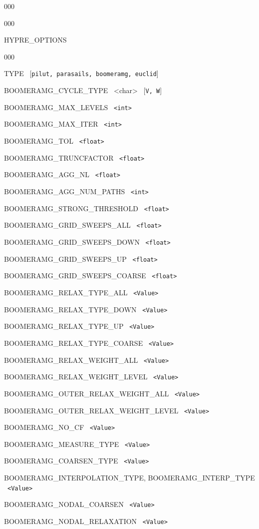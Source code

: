 \begin{deflist}{000}
\begin{deflist}{000}
\item[HYPRE\_OPTIONS]
\begin{deflist}{000}
\item[TYPE] \ [{\tt pilut, parasails, boomeramg, euclid}]
\item[BOOMERAMG\_CYCLE\_TYPE] \ <char> \ [{\tt V, W}]
\item[BOOMERAMG\_MAX\_LEVELS] \ {\tt <int>}
\item[BOOMERAMG\_MAX\_ITER] \ {\tt <int>}
\item[BOOMERAMG\_TOL] \ {\tt <float>}
\item[BOOMERAMG\_TRUNCFACTOR] \ {\tt <float>}
\item[BOOMERAMG\_AGG\_NL] \ {\tt <float>}
\item[BOOMERAMG\_AGG\_NUM\_PATHS] \ {\tt <int>}
\item[BOOMERAMG\_STRONG\_THRESHOLD] \ {\tt <float>}
\item[BOOMERAMG\_GRID\_SWEEPS\_ALL] \ {\tt <float>}
\item[BOOMERAMG\_GRID\_SWEEPS\_DOWN] \ {\tt <float>}
\item[BOOMERAMG\_GRID\_SWEEPS\_UP] \ {\tt <float>}
\item[BOOMERAMG\_GRID\_SWEEPS\_COARSE] \ {\tt <float>}
\item[BOOMERAMG\_RELAX\_TYPE\_ALL] \ {\tt <Value>}
\item[BOOMERAMG\_RELAX\_TYPE\_DOWN] \ {\tt <Value>}
\item[BOOMERAMG\_RELAX\_TYPE\_UP] \ {\tt <Value>}
\item[BOOMERAMG\_RELAX\_TYPE\_COARSE] \ {\tt <Value>}
\item[BOOMERAMG\_RELAX\_WEIGHT\_ALL] \ {\tt <Value>}
\item[BOOMERAMG\_RELAX\_WEIGHT\_LEVEL] \ {\tt <Value>}
\item[BOOMERAMG\_OUTER\_RELAX\_WEIGHT\_ALL] \ {\tt <Value>}
\item[BOOMERAMG\_OUTER\_RELAX\_WEIGHT\_LEVEL] \ {\tt <Value>}
\item[BOOMERAMG\_NO\_CF] \ {\tt <Value>}
\item[BOOMERAMG\_MEASURE\_TYPE] \ {\tt <Value>}
\item[BOOMERAMG\_COARSEN\_TYPE] \ {\tt <Value>}
\item[BOOMERAMG\_INTERPOLATION\_TYPE, BOOMERAMG\_INTERP\_TYPE] \ {\tt <Value>}
\item[BOOMERAMG\_NODAL\_COARSEN] \ {\tt <Value>}
\item[BOOMERAMG\_NODAL\_RELAXATION] \ {\tt <Value>}
\end{deflist}


\end{deflist}
\end{deflist}

